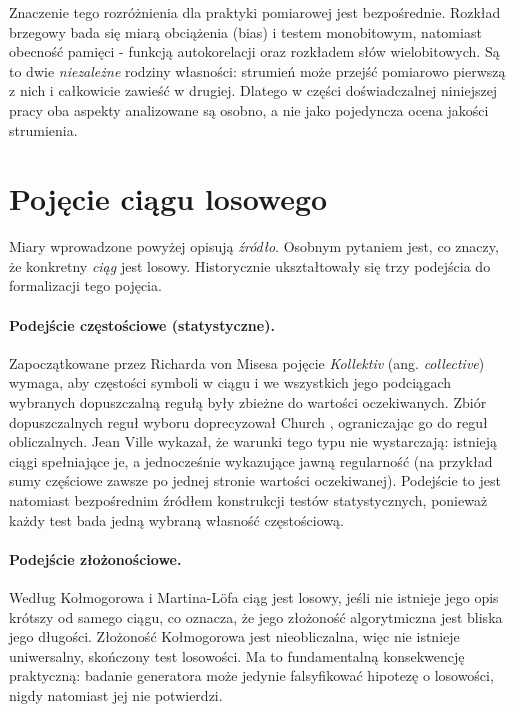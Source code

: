 Znaczenie tego rozróżnienia dla praktyki pomiarowej jest bezpośrednie.
Rozkład brzegowy bada się miarą obciążenia (bias) i testem monobitowym,
natomiast obecność pamięci - funkcją autokorelacji oraz rozkładem słów
wielobitowych. Są to dwie \emph{niezależne} rodziny własności: strumień może
przejść pomiarowo pierwszą z nich i całkowicie zawieść w drugiej. Dlatego
w części doświadczalnej niniejszej pracy oba aspekty analizowane są osobno,
a nie jako pojedyncza ocena jakości strumienia.

\section{Pojęcie ciągu losowego}

Miary wprowadzone powyżej opisują \emph{źródło}. Osobnym pytaniem jest, co
znaczy, że konkretny \emph{ciąg} jest losowy. Historycznie ukształtowały się
trzy podejścia do formalizacji tego pojęcia.

\paragraph{Podejście częstościowe (statystyczne).}
Zapoczątkowane przez Richarda von Misesa \cite{vonmises1919} pojęcie
\emph{Kollektiv} (ang. \emph{collective}) wymaga, aby częstości symboli
w ciągu i we wszystkich jego podciągach wybranych dopuszczalną regułą były
zbieżne do wartości oczekiwanych. Zbiór dopuszczalnych reguł wyboru
doprecyzował Church \cite{church1940}, ograniczając go do reguł obliczalnych.
Jean Ville \cite{ville1939} wykazał, że warunki tego typu nie wystarczają:
istnieją ciągi spełniające je, a jednocześnie wykazujące jawną regularność
(na przykład sumy częściowe zawsze po jednej stronie wartości oczekiwanej).
Podejście to jest natomiast bezpośrednim źródłem konstrukcji testów
statystycznych, ponieważ każdy test bada jedną wybraną własność częstościową.

\paragraph{Podejście złożonościowe.}
Według Kołmogorowa \cite{kolmogorov1965three} i Martina-Löfa
\cite{martinlof1966} ciąg jest losowy, jeśli nie istnieje jego opis krótszy
od samego ciągu, co oznacza, że jego złożoność algorytmiczna jest bliska
jego długości. Złożoność Kołmogorowa jest nieobliczalna, więc nie istnieje
uniwersalny, skończony test losowości. Ma to fundamentalną konsekwencję
praktyczną: badanie generatora może jedynie falsyfikować hipotezę
o losowości, nigdy natomiast jej nie potwierdzi.

